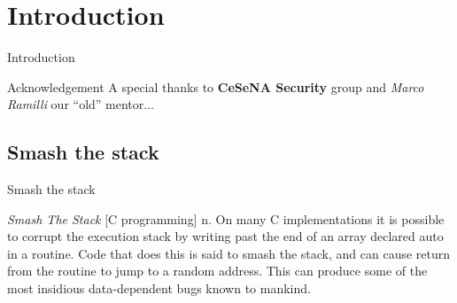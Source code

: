 \section{Introduction}
\begin{frame}{Introduction}
\begin{block}{Acknowledgement}
A special thanks to {\bf CeSeNA Security} group and \emph{Marco Ramilli} our ``old'' mentor...
\end{block}
\end{frame}

\subsection{Smash the stack}
\begin{frame}{Smash the stack}
\begin{block}{\emph{Smash The Stack} [C programming] n.}
On many C implementations it is possible to corrupt the execution stack by writing past the end of an array declared auto in a routine. Code that does this is said to smash the stack, and can cause return from the routine to jump to a random address. This can produce some of the most insidious data-dependent bugs known to mankind.
\end{block}
\end{frame}
